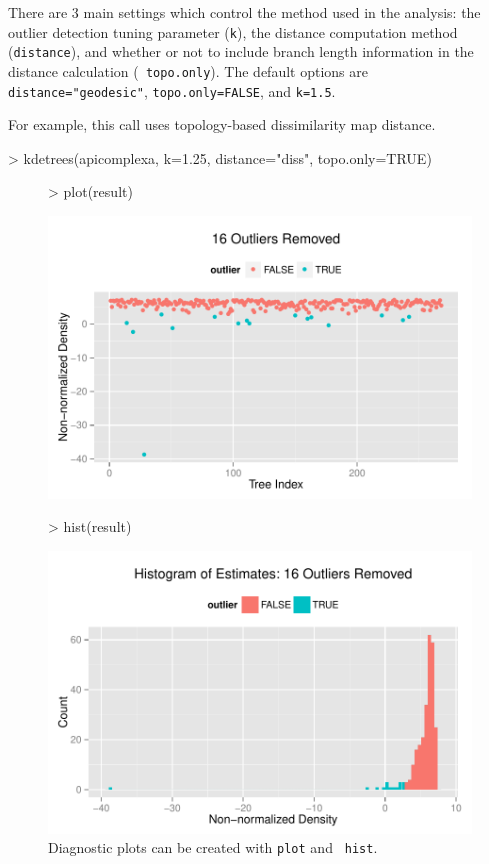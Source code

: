 \documentclass{article}
\begin{document}
There are 3 main settings which control the method used in the
analysis: the outlier detection tuning parameter ({\tt k}), the
distance computation method ({\tt distance}), and whether or not to
include branch length information in the distance calculation ({\tt
  topo.only}).  The default options are {\tt distance="geodesic"},
{\tt topo.only=FALSE}, and {\tt k=1.5}.


For example, this call uses topology-based dissimilarity map distance.
\begin{Schunk}
\begin{Sinput}
> kdetrees(apicomplexa, k=1.25, distance="diss", topo.only=TRUE)
\end{Sinput}
\end{Schunk}

\begin{figure}
  \centering
\begin{Schunk}
\begin{Sinput}
> plot(result)
\end{Sinput}
\end{Schunk}
\includegraphics{kdetrees-plot}
\begin{Schunk}
\begin{Sinput}
> hist(result)
\end{Sinput}
\end{Schunk}
\includegraphics{kdetrees-hist}
  \caption{Diagnostic plots can be created with {\tt plot} and {\tt
      hist}.}
  \label{fig:diagplots}
\end{figure}
\end{document}
